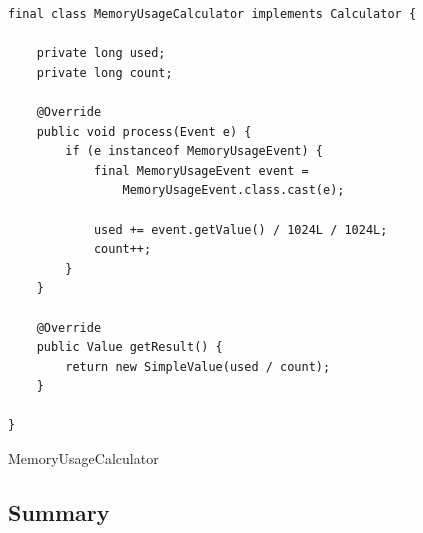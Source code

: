 \begin{listing}[H]
\begin{verbatim}
final class MemoryUsageCalculator implements Calculator {

    private long used;
    private long count;

    @Override
    public void process(Event e) {
        if (e instanceof MemoryUsageEvent) {
            final MemoryUsageEvent event = 
                MemoryUsageEvent.class.cast(e);

            used += event.getValue() / 1024L / 1024L;
            count++;
        }
    }

    @Override
    public Value getResult() {
        return new SimpleValue(used / count);
    }

}
\end{verbatim}
\caption{MemoryUsageCalculator}
\label{lst:memory-calculator}
\end{listing}

\subsection{Summary}
